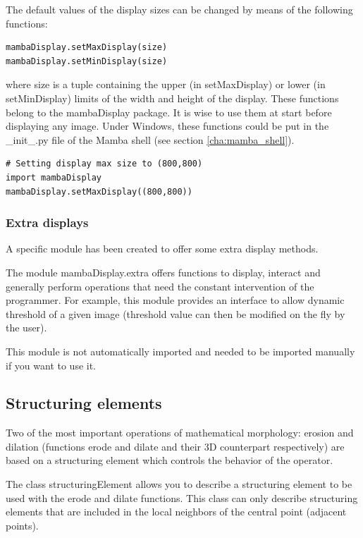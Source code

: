 \documentclass[a4paper,10pt,oneside]{article}
\begin{document}
The default values of the display sizes can be changed by means of the following
functions:

\lstset{language=Python}
\begin{lstlisting}
mambaDisplay.setMaxDisplay(size)
mambaDisplay.setMinDisplay(size)
\end{lstlisting}

where size is a tuple containing the upper (in setMaxDisplay) or lower (in
setMinDisplay) limits of the width and height of the display.
These functions belong to the mambaDisplay package. It is wise to use them at
start before displaying any image. Under Windows, these functions could be put
in the \_init\_.py file of the Mamba shell (see section \ref{cha:mamba_shell}).

\lstset{language=Python}
\begin{lstlisting}
# Setting display max size to (800,800)
import mambaDisplay
mambaDisplay.setMaxDisplay((800,800))
\end{lstlisting}

\subsubsection{Extra displays}

A specific module has been created to offer some extra display methods.

The module mambaDisplay.extra offers functions to display, interact and generally 
perform operations that need the constant intervention of the programmer. For
example, this module provides an interface to allow dynamic threshold of a given
image (threshold value can then be modified on the fly by the user).

This module is not automatically imported and needed to be imported manually if
you want to use it.

\subsection{Structuring elements}

Two of the most important operations of mathematical morphology: erosion and
dilation (functions erode and dilate and their 3D counterpart respectively)
are based on a structuring element which controls the behavior of the operator.

The class structuringElement allows you to describe a structuring element to
be used with the erode and dilate functions. This class can only describe
structuring elements that are included in the local 
neighbors of the central point (adjacent points).
\end{document}
